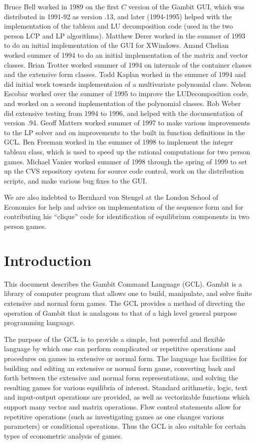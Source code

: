 Bruce Bell worked in 1989 on the first $C$ version of the Gambit GUI,
which was distributed in 1991-92 as version .13, and later (1994-1995)
helped with the implementation of the tableau and LU decomposition
code (used in the two person LCP and LP algorithms). Matthew Derer
worked in the summer of 1993 to do an initial implementation of the
GUI for XWindows.  Anand Chelian worked summer of 1994 to do an
initial implementation of the matrix and vector classes.  Brian
Trotter worked summer of 1994 on internals of the container classes
and the extensive form classes.  Todd Kaplan worked in the summer of
1994 and did initial work towards implementaion of a multivariate
polynomial class.  Nelson Escobar worked over the summer of 1995 to
improve the LUDecomposition code, and worked on a second
implementation of the polynomial classes.  Rob Weber did extensive
testing from 1994 to 1996, and helped with the documentation of
version .94.  Geoff Matters worked summer of 1997 to make various
improvements to the LP solver and on improvements to the built in
function definitions in the GCL.  Ben Freeman worked in the summer of
1998 to implement the integer tableau class, which is used to speed up
the rational computations for two person games.  Michael Vanier worked
summer of 1998 through the spring of 1999 to set up the CVS repository
system for source code control, work on the distribution scripts, and
make various bug fixes to the GUI.

We are also indebted to Bernhard von Stengel at the London School of
Economics for help and advice on implementation of the sequence form
and for contributing his ``clique'' code for identification of
equilibrium components in two person games.


\chapter{Introduction}
\pagestyle{headings}

This document describes the Gambit Command Language (GCL).  Gambit is
a library of computer program that allows one to build, manipulate,
and solve finite extensive and normal form games. The GCL provides a
method of directing the operation of Gambit that is analagous to that
of a high level general purpose programming language.

The purpose of the GCL is to provide a simple, but powerful and
flexible language by which one can perform complicated or repetitive
operations and procedures on games in extensive or normal form.  The
language has facilities for building and editing an extensive or
normal form game, converting back and forth between the extensive and
normal form representations, and solving the resulting games for
various equilibria of interest.  Standard arithmetic, logic, text and
input-output operations are provided, as well as vectorizable
functions which support many vector and matrix operations.  Flow
control statements allow for repetitive operations (such as
investigating games as one changes various parameters) or conditional
operations.  Thus the GCL is also suitable for certain types of
econometric analysis of games.


